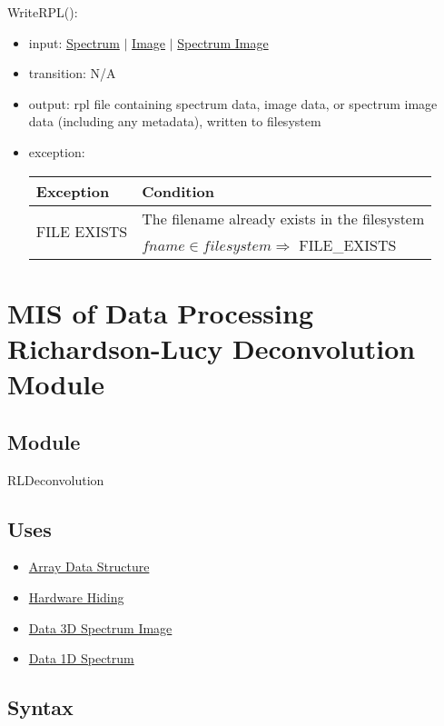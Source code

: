 \documentclass[12pt, titlepage]{article}
\begin{document}
\noindent WriteRPL():
\begin{itemize}
    \item input: \hyperref[Mod:Spectrum]{Spectrum} $|$ \hyperref[Mod:Image]{Image} $|$ \hyperref[Mod:SI]{Spectrum Image}
    \item transition: N/A
    \item output: rpl file containing spectrum data, image data, or spectrum image data (including any metadata), written to filesystem
    \item exception:
    \begin{center}
        \begin{tabular}{p{3cm} p{12cm}}
            \toprule[0.15em]
            \textbf{Exception} & \textbf{Condition}\\
            \midrule[0.1em]
            \multirow{2}{0.25\textwidth}{FILE EXISTS} & The filename already exists in the filesystem\\ 
            & $fname \in filesystem \Rightarrow$ FILE\_EXISTS\\ 
            \bottomrule[0.15em]
        \end{tabular}
    \end{center}
\end{itemize}

\section{MIS of Data Processing Richardson-Lucy Deconvolution Module} \label{Mod: RLDeconvolution}

\subsection{Module}

RLDeconvolution

\subsection{Uses}
\begin{itemize}
    \item \hyperref[Mod:Array]{Array Data Structure}
    \item \hyperref[Mod:HH]{Hardware Hiding}
    \item \hyperref[Mod:SI]{Data 3D Spectrum Image}
    \item \hyperref[Mod:Spectrum]{Data 1D Spectrum}
\end{itemize}

\subsection{Syntax}
\end{document}

